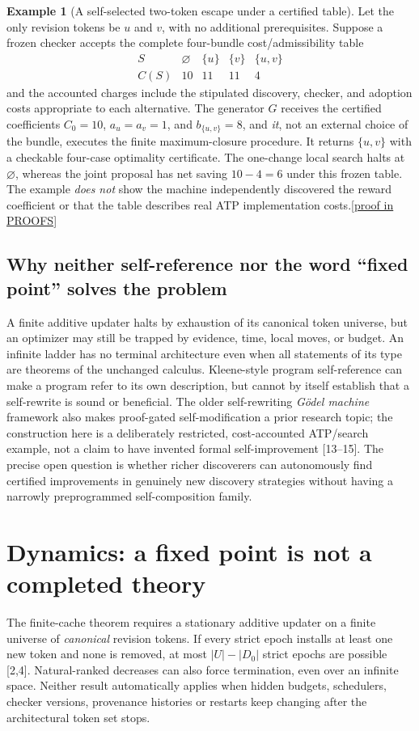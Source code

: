 \documentclass[11pt,letterpaper]{article}
\theoremstyle{definition}
\newtheorem{example}[theorem]{Example}
\theoremstyle{remark}
\newcommand{\prooflink}[1]{\hfill\hyperlink{proof:#1}{\footnotesize[proof in PROOFS]}}
\newcommand{\src}[1]{\textup{[#1]}}
\begin{document}
\begin{example}[A self-selected two-token escape under a certified table]\label{ex:twotoken}\hypertarget{claim:twotoken}{}
Let the only revision tokens be $u$ and $v$, with no additional prerequisites. Suppose a frozen checker accepts the complete four-bundle cost/admissibility table
\[
\begin{array}{c|rrrr}
S &\varnothing&\{u\}&\{v\}&\{u,v\}\\\hline
C(S)&10&11&11&4
\end{array}
\]
and the accounted charges include the stipulated discovery, checker, and adoption costs appropriate to each alternative. The generator $G$ receives the certified coefficients $C_0=10$, $a_u=a_v=1$, and $b_{\{u,v\}}=8$, and \emph{it}, not an external choice of the bundle, executes the finite maximum-closure procedure. It returns $\{u,v\}$ with a checkable four-case optimality certificate. The one-change local search halts at $\varnothing$, whereas the joint proposal has net saving $10-4=6$ under this frozen table. The example \emph{does not} show the machine independently discovered the reward coefficient or that the table describes real ATP implementation costs.\prooflink{twotoken}
\end{example}

\subsection*{Why neither self-reference nor the word ``fixed point'' solves the problem}
A finite additive updater halts by exhaustion of its canonical token universe, but an optimizer may still be trapped by evidence, time, local moves, or budget. An infinite ladder has no terminal architecture even when all statements of its type are theorems of the unchanged calculus. Kleene-style program self-reference can make a program refer to its own description, but cannot by itself establish that a self-rewrite is sound or beneficial. The older self-rewriting \emph{G\"odel machine} framework also makes proof-gated self-modification a prior research topic; the construction here is a deliberately restricted, cost-accounted ATP/search example, not a claim to have invented formal self-improvement \src{13--15}. The precise open question is whether richer discoverers can autonomously find certified improvements in genuinely new discovery strategies without having a narrowly preprogrammed self-composition family.

\section{Dynamics: a fixed point is not a completed theory}
The finite-cache theorem requires a stationary additive updater on a finite universe of \emph{canonical} revision tokens. If every strict epoch installs at least one new token and none is removed, at most $|U|-|D_0|$ strict epochs are possible \src{2,4}. Natural-ranked decreases can also force termination, even over an infinite space. Neither result automatically applies when hidden budgets, schedulers, checker versions, provenance histories or restarts keep changing after the architectural token set stops.
\end{document}
